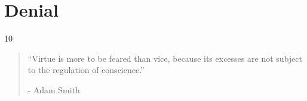 \chapter{Denial} %

\vspace{-1.3cm}
\begin{localsize}{10}
    \begin{quote}
        “Virtue is more to be feared than vice, because its excesses are not subject to the regulation of conscience.”
        \begin{flushright}- Adam Smith \end{flushright}
    \end{quote}
\end{localsize}
\vspace{1cm}